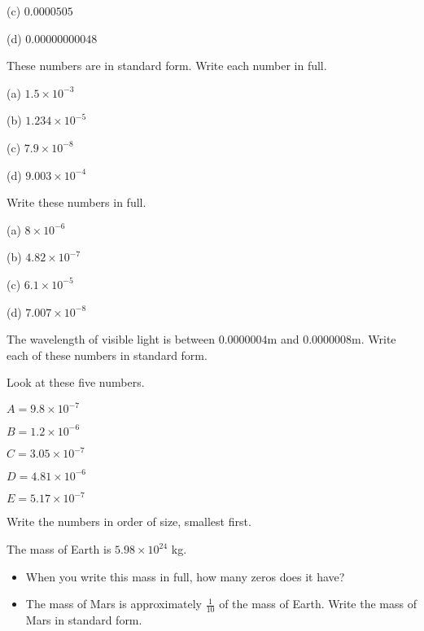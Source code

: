\begin{multicols}{2}
\begin{uzd}
\begin{multicols}{2}
(c) $0.0000505$  

(d) $0.00000000048$
\end{multicols}
\end{uzd}


\begin{uzd}
These numbers are in standard form. Write each number in full.
\resetcolumnrule
\begin{multicols}{2}
(a) $1.5 \times 10^{-3}$  

(b) $1.234 \times 10^{-5}$  

(c) $7.9 \times 10^{-8}$  

(d) $9.003 \times 10^{-4}$
\end{multicols}
\end{uzd}


\begin{uzd}
Write these numbers in full.
\resetcolumnrule
  \begin{multicols}{2}
(a) $8 \times 10^{-6}$  

(b) $4.82 \times 10^{-7}$  

(c) $6.1 \times 10^{-5}$  

(d) $7.007 \times 10^{-8}$
\end{multicols}
\end{uzd}


\begin{uzd}
The wavelength of visible light is between $0.0000004$m and $0.0000008$m.  
Write each of these numbers in standard form.
\end{uzd}


\begin{uzd}
Look at these five numbers.  
\resetcolumnrule
\begin{multicols}{2}
$A = 9.8 \times 10^{-7}$

$B = 1.2 \times 10^{-6}$

$C = 3.05 \times 10^{-7}$

$D = 4.81 \times 10^{-6}$

$E = 5.17 \times 10^{-7}$ 
\end{multicols}
Write the numbers in order of size, smallest first.
\end{uzd}


\begin{uzd}
The mass of Earth is $5.98 \times 10^{24}$ kg.  

\begin{itemize}
\item[(a)] When you write this mass in full, how many zeros does it have?  
\item[(b)] The mass of Mars is approximately $\tfrac{1}{10}$ of the mass of Earth.  
Write the mass of Mars in standard form.
\end{itemize}
\end{uzd}



\end{multicols}
